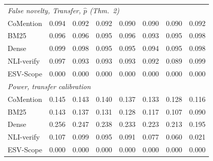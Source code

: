 \begin{tabular}{lccccccc}
\multicolumn{8}{l}{\emph{False novelty, Transfer, $\hat p$ (Thm.~2)}} \\
CoMention & 0.094 & 0.092 & 0.092 & 0.090 & 0.090 & 0.090 & 0.092 \\
BM25 & 0.096 & 0.096 & 0.095 & 0.096 & 0.093 & 0.095 & 0.098 \\
Dense & 0.099 & 0.098 & 0.095 & 0.095 & 0.094 & 0.095 & 0.098 \\
NLI-verify & 0.097 & 0.093 & 0.093 & 0.093 & 0.092 & 0.089 & 0.099 \\
ESV-Scope & 0.000 & 0.000 & 0.000 & 0.000 & 0.000 & 0.000 & 0.000 \\
\multicolumn{8}{l}{\emph{Power, transfer calibration}} \\
CoMention & 0.145 & 0.143 & 0.140 & 0.137 & 0.133 & 0.128 & 0.116 \\
BM25 & 0.143 & 0.137 & 0.131 & 0.128 & 0.117 & 0.107 & 0.090 \\
Dense & 0.256 & 0.247 & 0.238 & 0.233 & 0.223 & 0.213 & 0.195 \\
NLI-verify & 0.107 & 0.099 & 0.095 & 0.091 & 0.077 & 0.060 & 0.021 \\
ESV-Scope & 0.000 & 0.000 & 0.000 & 0.000 & 0.000 & 0.000 & 0.000 \\
\bottomrule
\end{tabular}

